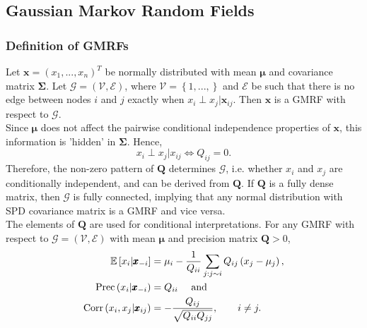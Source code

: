 \documentclass[12pt]{book}
\begin{document}
\subsection{Gaussian Markov Random Fields}
\subsubsection{Definition of GMRFs}
Let $\pmb{x}=\left(x_1,...,x_n\right)^T$ be normally distributed with mean $\pmb{\mu}$ and covariance matrix $\pmb{\Sigma}$. Let $\mathcal{G}=\left(\mathcal{V}, \mathcal{E}\right)$, where $\mathcal{V}=\left\lbrace 1,...,\right\rbrace$ and $\mathcal{E}$ be such that there is no edge between nodes $i$ and $j$ exactly when $x_i\perp x_j|\pmb{x}_{ij}$. Then $\pmb{x}$ is a GMRF with respect to $\mathcal{G}$. \\
Since $\pmb{\mu}$ does not affect the pairwise conditional independence properties of $\pmb{x}$, this information is 'hidden' in $\pmb{\Sigma}$. Hence,
\begin{equation*}
    x_i\perp x_j|x_{ij}\Longleftrightarrow Q_{ij}=0.
\end{equation*}
Therefore, the non-zero pattern of $\pmb{Q}$ determines $\mathcal{G}$, i.e. whether $x_i$ and $x_j$ are conditionally independent, and can be derived from $\pmb{Q}$. If $\pmb{Q}$ is a fully dense matrix, then $\mathcal{G}$ is fully connected, implying that any normal distribution with SPD covariance matrix is a GMRF and vice versa. \\
The elements of $\pmb{Q}$ are used for conditional interpretations. For any GMRF with respect to $\mathcal{G}=\left(\mathcal{V}, \mathcal{E}\right)$ with mean $\pmb{\mu}$ and precision matrix $\pmb{Q} > 0$,
\begin{align}
    \mathbb{E}\left[x_i|\pmb{x}_{-i}\right] &= \mu_i-\frac{1}{Q_{ii}}\sum_{j:j\sim i}Q_{ij}\left(x_j-\mu_j\right), \label{eq:mean_gmrf}\\
    \hbox{Prec}\left(x_i|\pmb{x}_{-i}\right) &= Q_{ii} \hspace{10pt}\hbox{ and }\label{eq:prec_gmrf}\\
    \hbox{Corr}\left(x_i,x_j|\pmb{x}_{ij}\right) &= -\frac{Q_{ij}}{\sqrt{Q_{ii}Q_{jj}}},\hspace{20pt} i\neq j.
\end{align}
\end{document}
